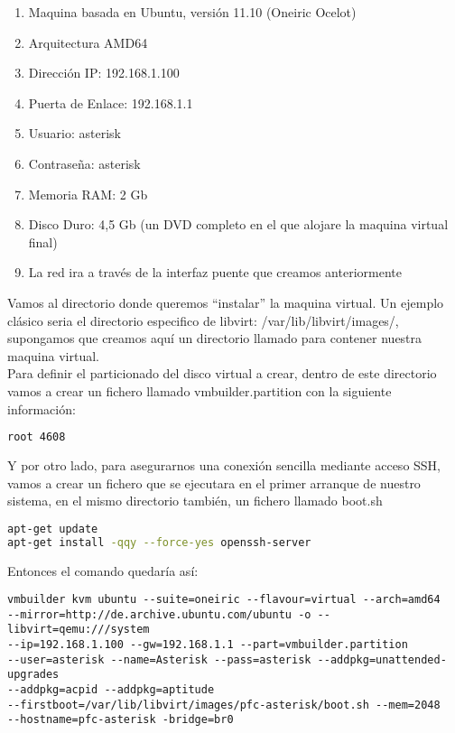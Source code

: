 \begin{enumerate}
\item Maquina basada en Ubuntu, versión 11.10 (Oneiric Ocelot)
\item Arquitectura AMD64
\item Dirección IP: 192.168.1.100
\item Puerta de Enlace: 192.168.1.1
\item Usuario: asterisk
\item Contraseña: asterisk
\item Memoria RAM: 2 Gb
\item Disco Duro: 4,5 Gb (un DVD completo en el que alojare la maquina virtual final)
\item La red ira a través de la interfaz puente que creamos anteriormente
\end{enumerate}

Vamos al directorio donde queremos “instalar” la maquina virtual. Un ejemplo clásico seria el directorio especifico de libvirt: /var/lib/libvirt/images/, supongamos que creamos aquí un directorio llamado  para contener nuestra maquina virtual. \\

Para definir el particionado del disco virtual a crear, dentro de este directorio vamos a crear un fichero llamado vmbuilder.partition con la siguiente información:\\

\begin{lstlisting}[language=bash]
root 4608
\end{lstlisting}

Y por otro lado, para asegurarnos una conexión sencilla mediante acceso SSH, vamos a crear un fichero que se ejecutara en el primer arranque de nuestro sistema, en el mismo directorio también, un fichero llamado boot.sh

\begin{lstlisting}[language=bash]
apt-get update
apt-get install -qqy --force-yes openssh-server
\end{lstlisting}

Entonces el comando quedaría así:

\begin{lstlisting}[style=consola]
vmbuilder kvm ubuntu --suite=oneiric --flavour=virtual --arch=amd64 
--mirror=http://de.archive.ubuntu.com/ubuntu -o --libvirt=qemu:///system 
--ip=192.168.1.100 --gw=192.168.1.1 --part=vmbuilder.partition 
--user=asterisk --name=Asterisk --pass=asterisk --addpkg=unattended-upgrades 
--addpkg=acpid --addpkg=aptitude 
--firstboot=/var/lib/libvirt/images/pfc-asterisk/boot.sh --mem=2048 
--hostname=pfc-asterisk -bridge=br0
\end{lstlisting}

